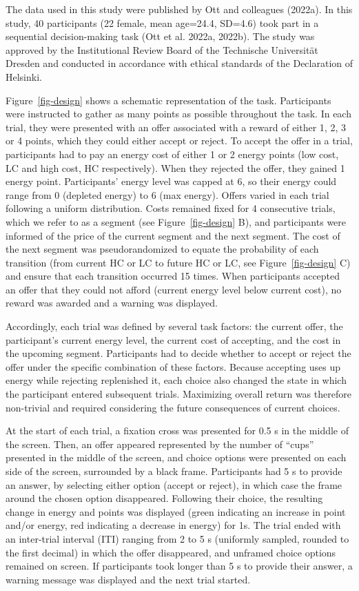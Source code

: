 \documentclass[
  letterpaper,
  DIV=11,
  numbers=noendperiod]{scrartcl}
\begin{document}
The data used in this study were published by Ott and colleagues
(2022a). In this study, 40 participants (22 female, mean age=24.4,
SD=4.6) took part in a sequential decision-making task (Ott et al.
2022a, 2022b). The study was approved by the Institutional Review Board
of the Technische Universität Dresden and conducted in accordance with
ethical standards of the Declaration of Helsinki.

Figure~\ref{fig-design} shows a schematic representation of the task.
Participants were instructed to gather as many points as possible
throughout the task. In each trial, they were presented with an offer
associated with a reward of either 1, 2, 3 or 4 points, which they could
either accept or reject. To accept the offer in a trial, participants
had to pay an energy cost of either 1 or 2 energy points (low cost, LC
and high cost, HC respectively). When they rejected the offer, they
gained 1 energy point. Participants' energy level was capped at 6, so
their energy could range from 0 (depleted energy) to 6 (max energy).
Offers varied in each trial following a uniform distribution. Costs
remained fixed for 4 consecutive trials, which we refer to as a segment
(see Figure~\ref{fig-design} B), and participants were informed of the
price of the current segment and the next segment. The cost of the next
segment was pseudorandomized to equate the probability of each
transition (from current HC or LC to future HC or LC, see
Figure~\ref{fig-design} C) and ensure that each transition occurred 15
times. When participants accepted an offer that they could not afford
(current energy level below current cost), no reward was awarded and a
warning was displayed.

Accordingly, each trial was defined by several task factors: the current
offer, the participant's current energy level, the current cost of
accepting, and the cost in the upcoming segment. Participants had to
decide whether to accept or reject the offer under the specific
combination of these factors. Because accepting uses up energy while
rejecting replenished it, each choice also changed the state in which
the participant entered subsequent trials. Maximizing overall return was
therefore non-trivial and required considering the future consequences
of current choices.

At the start of each trial, a fixation cross was presented for 0.5 s in
the middle of the screen. Then, an offer appeared represented by the
number of ``cups'' presented in the middle of the screen, and choice
options were presented on each side of the screen, surrounded by a black
frame. Participants had 5 s to provide an answer, by selecting either
option (accept or reject), in which case the frame around the chosen
option disappeared. Following their choice, the resulting change in
energy and points was displayed (green indicating an increase in point
and/or energy, red indicating a decrease in energy) for 1s. The trial
ended with an inter-trial interval (ITI) ranging from 2 to 5 s
(uniformly sampled, rounded to the first decimal) in which the offer
disappeared, and unframed choice options remained on screen. If
participants took longer than 5 s to provide their answer, a warning
message was displayed and the next trial started.
\end{document}
